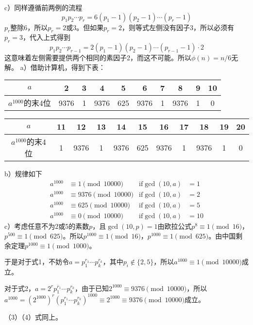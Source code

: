 c）同样遵循前两例的流程
\[p_1p_2\cdots p_r=6(p_1-1)(p_2-1)\cdots(p_r-1)\]
$p_r$整除6，所以$p_r=2$或$3$。但如果$p_r=2$，则等式左侧没有因子3，所以必须有$p_r=3$，代入上式得到
\[p_1p_2\cdots p_{r-1}=2(p_1-1)(p_2-1)\cdots(p_{r-1}-1)\cdot 2\]
这意味着左侧需要提供两个相同的素因子2，而这不可能。所以$\phi(n)=n/6$无解。
%
\exercise a）借助计算机，得到下表：
\begin{center}
\begin{tabular}{c|*{9}{c}}
$a$ & 2 & 3 & 4 & 5 & 6 & 7 & 8 & 9 & 10\\
\hline
$a^{1000}$的末4位 & 9376 & 1 & 9376 & 625 & 9376 & 1 & 9376 & 1 & 0\\
\end{tabular}
\end{center}
\begin{center}
\begin{tabular}{c|*{10}{c}}
$a$ & 11 & 12 & 13 & 14 & 15 & 16 & 17 & 18 & 19 & 20\\
\hline
$a^{1000}$的末4位 & 1 & 9376 & 1 & 9376 & 625 & 9376 & 1 & 9376 & 1 & 0\\
\end{tabular}
\end{center}
b）规律如下
\begin{align*}
a^{1000}&\equiv 1\pmod{10000}&\text{if}\gcd(10,a)&=1 \\
a^{1000}&\equiv 9376\pmod{10000}&\text{if}\gcd(10,a)&=2 \\
a^{1000}&\equiv 625\pmod{10000}&\text{if}\gcd(10,a)&=5 \\
a^{1000}&\equiv 0\pmod{10000}&\text{if}\gcd(10,a)&=10
\end{align*}
c）考虑任意不为2或5的素数$p$，且$\gcd(10,p)=1$由欧拉公式$p^8\equiv1\pmod{16}$，$p^{500}\equiv1\pmod{625}$。所以$p^{1000}\equiv1\pmod{16}$，$p^{1000}\equiv1\pmod{625}$。由中国剩余定理$p^{1000}\equiv1\pmod{1000}$。\par
于是对于式1，不妨令$a=p_1^{r_1}\cdots p_k^{r_k}$，其中$p_i\not\in\{2,5\}$，所以$a^{1000}\equiv 1\pmod{10000}$成立。\par
对于式2，$a=2^rp_1^{r_1}\cdots p_k^{r_k}$，由于已知$2^{1000}\equiv9376\pmod{10000}$，所以$a^{1000}=(2^{1000})^r(p_1^{r_1}\cdots p_k^{r_k})^1000\equiv 2^{1000}\equiv9376\pmod{10000}$成立。\par
（3）（4）式同上。